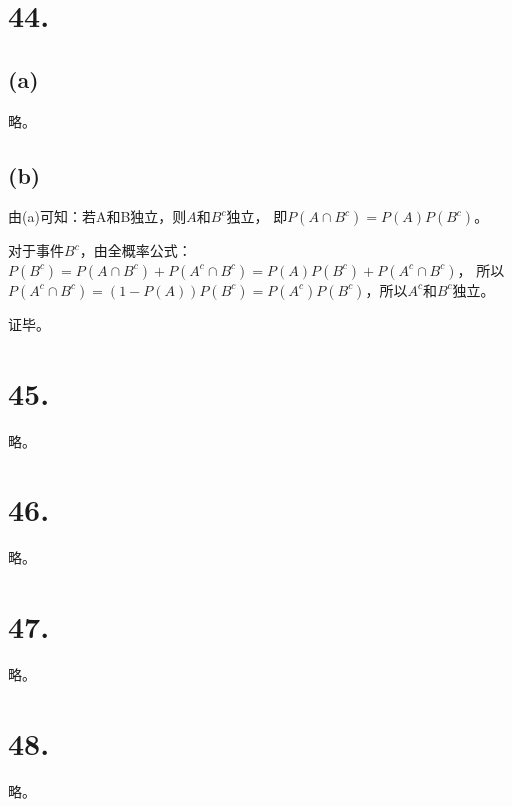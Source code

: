 \documentclass[UTF8]{report}
\begin{document}
    \section*{44.}
        \subsection*{(a)}
            略。
        \subsection*{(b)}
            由(a)可知：若A和B独立，则$A$和$B^c$独立，
            即$P(A \cap B^c) = P(A)P(B^c)$。

            对于事件$B^c$，由全概率公式：
            $P(B^c) = P(A \cap B^c) + P(A^c \cap B^c) = P(A)P(B^c) + P(A^c \cap B^c)$，
            所以$P(A^c \cap B^c) = (1 - P(A))P(B^c) = P(A^c)P(B^c)$，所以$A^c$和$B^c$独立。

            证毕。
    \section*{45.}
        略。
    \section*{46.}
        略。
    \section*{47.}
        略。
    \section*{48.}
        略。
\end{document}
